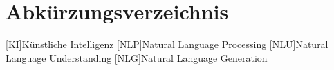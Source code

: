 
\clearpage
\chapter*{Abkürzungsverzeichnis}	

\begin{acronym}[XXXXXXX]
        [KI]{Künstliche Intelligenz}
        [NLP]{Natural Language Processing}
	[NLU]{Natural Language Understanding}
        [NLG]{Natural Language Generation}
\end{acronym}